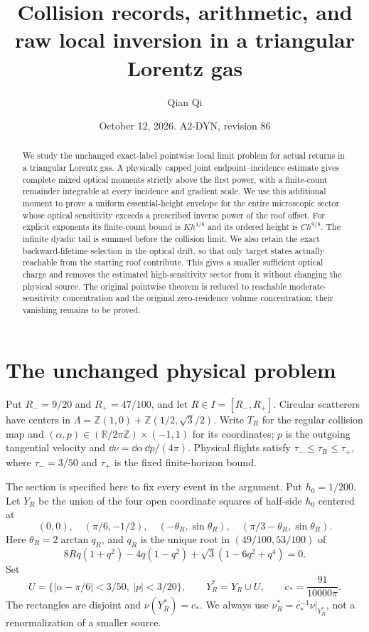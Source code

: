 \documentclass[11pt,reqno]{amsart}
\title[Collision records and raw local inversion]{Collision records, arithmetic, and raw local inversion in a triangular Lorentz gas}
\author{Qian Qi}
\date{October 12, 2026. A2-DYN, revision 86}
\numberwithin{equation}{section}
\theoremstyle{definition}
\theoremstyle{remark}\newtheorem{remark}[theorem]{Remark}
\newcommand{\R}{\mathbb R}\newcommand{\Z}{\mathbb Z}
\begin{document}
\raggedbottom
\begin{abstract}
We study the unchanged exact-label pointwise local limit problem for
actual returns in a triangular Lorentz gas. A physically capped joint
endpoint--incidence estimate gives complete mixed optical moments strictly
above the first power, with a finite-count remainder integrable at every
incidence and gradient scale. We use this additional moment to prove a
uniform essential-height envelope for the entire microscopic sector whose
optical sensitivity exceeds a prescribed inverse power of the roof offset.
For explicit exponents its finite-count bound is $K h^{1/8}$ and its
ordered height is $C h^{9/8}$. The infinite dyadic tail is summed before
the collision limit. We also retain the exact backward-lifetime selection
in the optical drift, so that only target states actually reachable from
the starting roof contribute. This gives a smaller sufficient optical
charge and removes the estimated high-sensitivity sector from it without
changing the physical source. The original pointwise theorem is reduced
to reachable moderate-sensitivity concentration and the original
zero-residence volume concentration; their vanishing remains to be proved.
\end{abstract}
\maketitle

\section{The unchanged physical problem}
Put $R_-=9/20$ and $R_+=47/100$, and let $R\in I=[R_-,R_+]$. Circular scatterers have centers in
$\Lambda=\Z(1,0)+\Z(1/2,\sqrt3/2)$. Write $T_R$ for the regular
collision map and $(\alpha,p)\in(\R/2\pi\Z)\times(-1,1)$ for its
coordinates; $p$ is the outgoing tangential velocity and
$\dd\nu=\dd\alpha\,\dd p/(4\pi)$. Physical flights satisfy
$\tau_-\le\tau_R\le\tau_+$, where $\tau_-=3/50$ and $\tau_+$
is the fixed finite-horizon bound.

The section is specified here to fix every event in the argument.
Put $h_0=1/200$. Let $Y_R$ be the union of the four open coordinate
squares of half-side $h_0$ centered at
\[
 (0,0),\quad(\pi/6,-1/2),\quad
 (-\theta_R,\sin\theta_R),\quad
 (\pi/3-\theta_R,\sin\theta_R).
\]
Here $\theta_R=2\arctan q_R$, and $q_R$ is the unique root in
$(49/100,53/100)$ of
\[
 8Rq(1+q^2)-4q(1-q^2)+\sqrt3(1-6q^2+q^4)=0.
\]
Set
\[
 U=\{|\alpha-\pi/6|<3/50,\ |p|<3/20\},\qquad
 Y_R^*=Y_R\cup U,\qquad c_*=\frac{91}{10000\pi}.
\]
The rectangles are disjoint and $\nu(Y_R^*)=c_*$. We always use
$\nu_R^*=c_*^{-1}\nu|_{Y_R^*}$, not a renormalization of a smaller
source.
\end{document}
